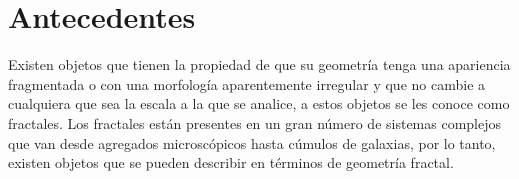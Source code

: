 \documentclass[11pt]{article}
\begin{document}

\section{Antecedentes}



Existen objetos que tienen la propiedad de que su geometría tenga una apariencia fragmentada o con una morfología aparentemente irregular y que no cambie a cualquiera que sea la escala a la que se analice, a estos objetos se les conoce como fractales. Los fractales están presentes en un gran número de sistemas complejos que van desde agregados microscópicos hasta cúmulos de galaxias, por lo tanto, existen objetos que se pueden describir en términos de geometría fractal. 
\end{document}
